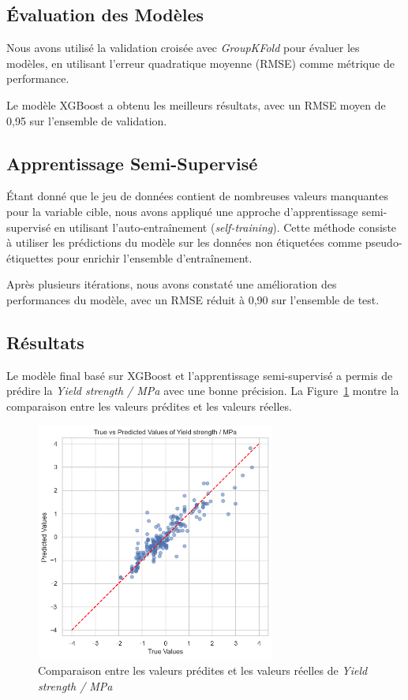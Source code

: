 \documentclass{article}
\begin{document}
\subsection{Évaluation des Modèles}

Nous avons utilisé la validation croisée avec \textit{GroupKFold} pour évaluer les modèles, en utilisant l'erreur quadratique moyenne (RMSE) comme métrique de performance.

Le modèle XGBoost a obtenu les meilleurs résultats, avec un RMSE moyen de 0,95 sur l'ensemble de validation.

\subsection{Apprentissage Semi-Supervisé}

Étant donné que le jeu de données contient de nombreuses valeurs manquantes pour la variable cible, nous avons appliqué une approche d'apprentissage semi-supervisé en utilisant l'auto-entraînement (\textit{self-training}). Cette méthode consiste à utiliser les prédictions du modèle sur les données non étiquetées comme pseudo-étiquettes pour enrichir l'ensemble d'entraînement.

Après plusieurs itérations, nous avons constaté une amélioration des performances du modèle, avec un RMSE réduit à 0,90 sur l'ensemble de test.

\subsection{Résultats}

Le modèle final basé sur XGBoost et l'apprentissage semi-supervisé a permis de prédire la \textit{Yield strength / MPa} avec une bonne précision. La Figure~\ref{fig:predictions_vs_true} montre la comparaison entre les valeurs prédites et les valeurs réelles.

\begin{figure}[H]
    \centering
    \includegraphics[width=0.7\textwidth]{images/predictions_vs_true.png}
    \caption{Comparaison entre les valeurs prédites et les valeurs réelles de \textit{Yield strength / MPa}}
    \label{fig:predictions_vs_true}
\end{figure}
\end{document}
